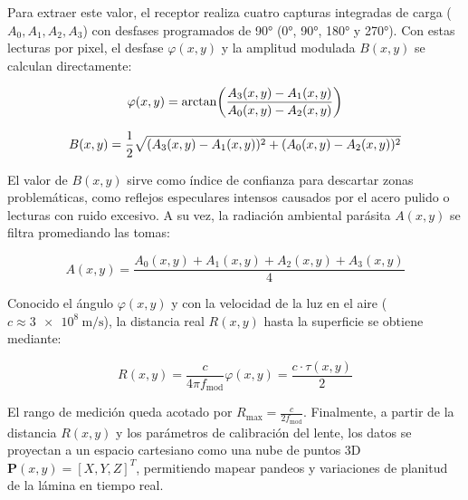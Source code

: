 Para extraer este valor, el receptor realiza cuatro capturas integradas de carga (\(A_0, A_1, A_2, A_3\)) con desfases programados de \ang{90} (\ang{0}, \ang{90}, \ang{180} y \ang{270}).
Con estas lecturas por pixel, el desfase \(\varphi(x, y)\) y la amplitud modulada \(B(x, y)\) se calculan directamente:

\begin{equation}
	\varphi(x, y) = \arctan\parens*{\frac{A_3(x, y) - A_1(x, y)}{A_0(x, y) - A_2(x, y)}}
\end{equation}

\begin{equation}
	B(x, y) = \frac{1}{2} \sqrt{(A_3(x, y) - A_1(x, y))^2 + (A_0(x, y) - A_2(x, y))^2}
\end{equation}

El valor de \(B(x, y)\) sirve como índice de confianza para descartar zonas problemáticas, como reflejos especulares intensos causados por el acero pulido o lecturas con ruido excesivo. A su vez, la radiación ambiental parásita \(A(x, y)\) se filtra promediando las tomas:

\begin{equation}
	A(x, y) = \frac{A_0(x, y) + A_1(x, y) + A_2(x, y) + A_3(x, y)}{4}
\end{equation}

Conocido el ángulo \(\varphi(x, y)\) y con la velocidad de la luz en el aire (\(c \approx \qty{3e8}{\metre\per\second}\)), la distancia real \(R(x, y)\) hasta la superficie se obtiene mediante:

\begin{equation}
	R(x, y) = \frac{c}{4\pi f_{\text{mod}}} \varphi(x, y) = \frac{c \cdot \tau(x, y)}{2}
\end{equation}

El rango de medición queda acotado por \(R_{\text{max}} = \frac{c}{2 f_{\text{mod}}}\).
Finalmente, a partir de la distancia \(R(x, y)\) y los parámetros de calibración del lente, los datos se proyectan a un espacio cartesiano como una nube de puntos 3D \(\mathbf{P}(x, y) = [X, Y, Z]^T\), permitiendo mapear pandeos y variaciones de planitud de la lámina en tiempo real.



%
